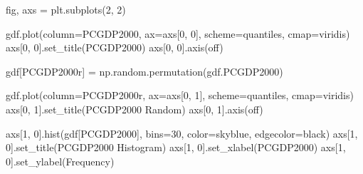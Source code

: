 \documentclass[
  a4paper, 
  twoside,
  final
]{article}
\newenvironment{Shaded}{\begin{snugshade}}{\end{snugshade}}
\newcommand{\DecValTok}[1]{\textcolor[rgb]{0.68,0.00,0.00}{#1}}
\newcommand{\NormalTok}[1]{\textcolor[rgb]{0.00,0.23,0.31}{#1}}
\newcommand{\OperatorTok}[1]{\textcolor[rgb]{0.37,0.37,0.37}{#1}}
\newcommand{\StringTok}[1]{\textcolor[rgb]{0.13,0.47,0.30}{#1}}
\begin{document}
\begin{Shaded}
\begin{Highlighting}[]
\NormalTok{fig, axs }\OperatorTok{=}\NormalTok{ plt.subplots(}\DecValTok{2}\NormalTok{, }\DecValTok{2}\NormalTok{)}

\NormalTok{gdf.plot(column}\OperatorTok{=}\StringTok{\textquotesingle{}PCGDP2000\textquotesingle{}}\NormalTok{, ax}\OperatorTok{=}\NormalTok{axs[}\DecValTok{0}\NormalTok{, }\DecValTok{0}\NormalTok{], scheme}\OperatorTok{=}\StringTok{\textquotesingle{}quantiles\textquotesingle{}}\NormalTok{,}
\NormalTok{         cmap}\OperatorTok{=}\StringTok{\textquotesingle{}viridis\textquotesingle{}}\NormalTok{)}
\NormalTok{axs[}\DecValTok{0}\NormalTok{, }\DecValTok{0}\NormalTok{].set\_title(}\StringTok{\textquotesingle{}PCGDP2000\textquotesingle{}}\NormalTok{)}
\NormalTok{axs[}\DecValTok{0}\NormalTok{, }\DecValTok{0}\NormalTok{].axis(}\StringTok{\textquotesingle{}off\textquotesingle{}}\NormalTok{)}


\NormalTok{gdf[}\StringTok{\textquotesingle{}PCGDP2000r\textquotesingle{}}\NormalTok{] }\OperatorTok{=}\NormalTok{ np.random.permutation(gdf.PCGDP2000)}

\NormalTok{gdf.plot(column}\OperatorTok{=}\StringTok{\textquotesingle{}PCGDP2000r\textquotesingle{}}\NormalTok{, ax}\OperatorTok{=}\NormalTok{axs[}\DecValTok{0}\NormalTok{, }\DecValTok{1}\NormalTok{], scheme}\OperatorTok{=}\StringTok{\textquotesingle{}quantiles\textquotesingle{}}\NormalTok{,}
\NormalTok{         cmap}\OperatorTok{=}\StringTok{\textquotesingle{}viridis\textquotesingle{}}\NormalTok{)}
\NormalTok{axs[}\DecValTok{0}\NormalTok{, }\DecValTok{1}\NormalTok{].set\_title(}\StringTok{\textquotesingle{}PCGDP2000 Random\textquotesingle{}}\NormalTok{)}
\NormalTok{axs[}\DecValTok{0}\NormalTok{, }\DecValTok{1}\NormalTok{].axis(}\StringTok{\textquotesingle{}off\textquotesingle{}}\NormalTok{)}

\NormalTok{axs[}\DecValTok{1}\NormalTok{, }\DecValTok{0}\NormalTok{].hist(gdf[}\StringTok{\textquotesingle{}PCGDP2000\textquotesingle{}}\NormalTok{], bins}\OperatorTok{=}\DecValTok{30}\NormalTok{, color}\OperatorTok{=}\StringTok{\textquotesingle{}skyblue\textquotesingle{}}\NormalTok{,}
\NormalTok{               edgecolor}\OperatorTok{=}\StringTok{\textquotesingle{}black\textquotesingle{}}\NormalTok{)}
\NormalTok{axs[}\DecValTok{1}\NormalTok{, }\DecValTok{0}\NormalTok{].set\_title(}\StringTok{\textquotesingle{}PCGDP2000 Histogram\textquotesingle{}}\NormalTok{)}
\NormalTok{axs[}\DecValTok{1}\NormalTok{, }\DecValTok{0}\NormalTok{].set\_xlabel(}\StringTok{\textquotesingle{}PCGDP2000\textquotesingle{}}\NormalTok{)}
\NormalTok{axs[}\DecValTok{1}\NormalTok{, }\DecValTok{0}\NormalTok{].set\_ylabel(}\StringTok{\textquotesingle{}Frequency\textquotesingle{}}\NormalTok{)}


\end{Highlighting}
\end{Shaded}
\end{document}
